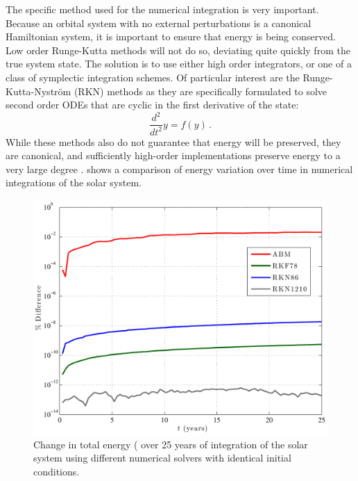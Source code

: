 The specific method used for the numerical integration is very important.  Because an orbital system with no external perturbations is a canonical Hamiltonian system, it is important to ensure that energy is being conserved.  Low order Runge-Kutta methods will not do so, deviating quite quickly from the true system state.  The solution is to use either high order integrators, or one of a class  of symplectic integration schemes.  Of particular interest are the Runge-Kutta-Nystr\"{o}m (RKN) methods as they are specifically formulated to solve second order ODEs that are cyclic in the first derivative of the state:
\begin{equation}
\frac{d^2}{dt^2} y = f(y) \,.
\end{equation}
While these methods also do not guarantee that energy will be preserved, they are canonical, and sufficiently high-order implementations preserve energy to a very large degree \citep{qin1991}.   shows a comparison of energy variation over time in numerical integrations of the solar system.
\begin{figure}[ht]
 \center
 \includegraphics[width= 5.5in]{./figures/integratorComp}
  \caption[Integrator Comparison]{ \label{fig:integratorComp} Change in total energy ( over 25 years of integration of the solar system using different numerical solvers with identical initial conditions.}
\end{figure} 
